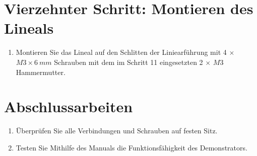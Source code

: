 \section{Vierzehnter Schritt: Montieren des Lineals}

\begin{enumerate}
	\item Montieren Sie das Lineal auf den Schlitten der Liniearführung mit 4 $\times$ $ M3 \times 6 \ mm $ Schrauben mit dem im Schritt 11 eingesetzten 2 $\times$ $ M3 $ Hammermutter.
\end{enumerate}


\section{Abschlussarbeiten}

\begin{enumerate}
	\item Überprüfen Sie alle Verbindungen und Schrauben auf festen Sitz.
	\item Testen Sie Mithilfe des Manuals die Funktionsfähigkeit des Demonstrators. 
\end{enumerate}
